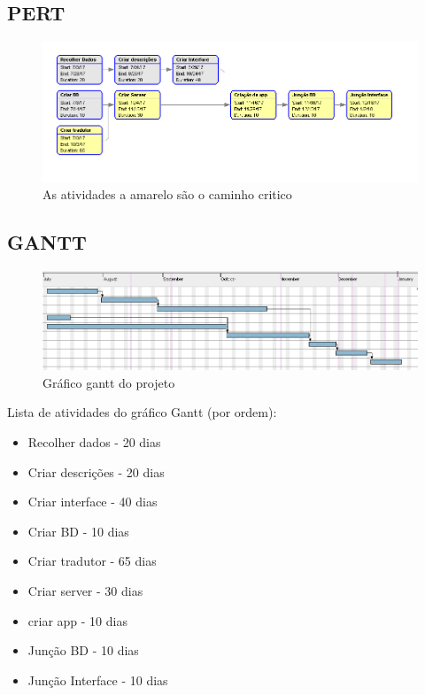 \documentclass[a4paper]{article}
\begin{document}
\subsection{PERT}

\begin{figure}[!ht]
\centering
\includegraphics[width=120mm]{pert.png}
\caption{As atividades a amarelo são o caminho critico}
\end{figure}

\newpage

\subsection{GANTT}

\begin{figure}[!ht]
\centering
\includegraphics[width=120mm]{gantt.png}
\caption{Gráfico gantt do projeto}
\end{figure}

Lista de atividades do gráfico Gantt (por ordem):
\begin{itemize}
\item Recolher dados - 20 dias
\item Criar descrições - 20 dias
\item Criar interface - 40 dias
\item Criar BD - 10 dias
\item Criar tradutor - 65 dias
\item Criar server - 30 dias
\item criar app - 10 dias
\item Junção BD - 10 dias
\item Junção Interface - 10 dias
\end{itemize}
\end{document}
